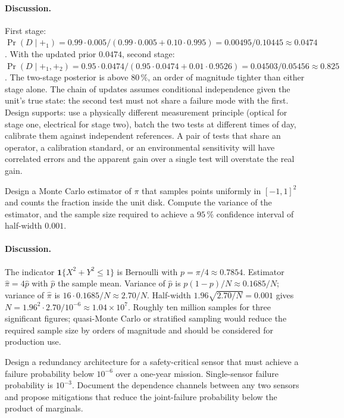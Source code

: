 \paragraph{Discussion.}
First stage: $\Pr(D \mid +_{1}) = 0.99 \cdot 0.005 / (0.99 \cdot
0.005 + 0.10 \cdot 0.995) = 0.00495 / 0.10445 \approx 0.0474$. With
the updated prior $0.0474$, second stage: $\Pr(D \mid +_{1}, +_{2})
= 0.95 \cdot 0.0474 / (0.95 \cdot 0.0474 + 0.01 \cdot 0.9526) =
0.04503 / 0.05456 \approx 0.825$. The two-stage posterior is above
$80\,\%$, an order of magnitude tighter than either stage alone.
The chain of updates assumes conditional independence given the
unit's true state: the second test must not share a failure mode
with the first. Design supports: use a physically different
measurement principle (optical for stage one, electrical for stage
two), batch the two tests at different times of day, calibrate them
against independent references. A pair of tests that share an
operator, a calibration standard, or an environmental sensitivity
will have correlated errors and the apparent gain over a single
test will overstate the real gain.

\begin{exercise}
Design a Monte Carlo estimator of $\pi$ that samples points uniformly
in $[-1, 1]^{2}$ and counts the fraction inside the unit disk.
Compute the variance of the estimator, and the sample size required
to achieve a $95\,\%$ confidence interval of half-width $0.001$.
\end{exercise}

\paragraph{Discussion.}
The indicator $\mathbf{1}\{X^{2} + Y^{2} \leq 1\}$ is Bernoulli
with $p = \pi/4 \approx 0.7854$. Estimator $\hat\pi = 4 \hat p$
with $\hat p$ the sample mean. Variance of $\hat p$ is $p(1 -
p)/N \approx 0.1685/N$; variance of $\hat\pi$ is
$16 \cdot 0.1685/N \approx 2.70/N$. Half-width
$1.96 \sqrt{2.70/N} = 0.001$ gives $N = 1.96^{2} \cdot 2.70 / 10^{-6}
\approx 1.04 \times 10^{7}$. Roughly ten million samples for three
significant figures; quasi-Monte Carlo or stratified sampling
would reduce the required sample size by orders of magnitude and
should be considered for production use.

\begin{exercise}
Design a redundancy architecture for a safety-critical sensor that
must achieve a failure probability below $10^{-6}$ over a one-year
mission. Single-sensor failure probability is $10^{-3}$. Document
the dependence channels between any two sensors and propose
mitigations that reduce the joint-failure probability below the
product of marginals.
\end{exercise}

